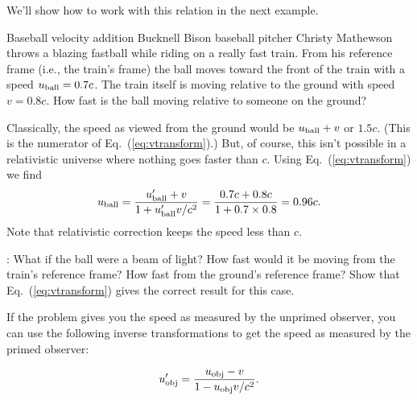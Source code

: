 We'll show how to work with this relation in the next example.

\begin{example}{Baseball velocity addition}
  Bucknell Bison baseball pitcher Christy Mathewson throws a blazing 
  fastball while riding on a really fast train.
  From his reference frame (i.e., the train's frame) the ball moves
  toward the front of the train with a speed $u_{\rm ball} = 0.7c$.
  The train itself is moving relative to the ground with speed $v =
  0.8c$.  How fast is the ball moving relative to someone on the
  ground?  

\solution Classically, the speed as viewed from the ground
  would be $u_{\rm ball} + v$ or $1.5c$.  (This is the numerator of
  Eq.~(\ref{eq:vtransform}).)  But, of course, this isn't possible in
  a relativistic universe where nothing goes faster than $c$.  Using
  Eq.~(\ref{eq:vtransform}) we find
\begin{equation}
  u_{\rm ball} = \frac{u_{\rm ball}^\prime + v}{1+ u_{\rm ball}^\prime v/c^2}
  = \frac{0.7c + 0.8c}{1+0.7\times 0.8} = 0.96c.
\end{equation}
Note that relativistic correction keeps the speed less than $c$.

: What if the ball were a beam of light?  How
fast would it be moving from the train's reference frame?  How fast
from the ground's reference frame?  Show that
Eq.~(\ref{eq:vtransform}) gives the correct result for this case.
\end{example}

If the problem gives you the speed as measured by the unprimed observer, 
you can use the following inverse transformations to get the speed as
measured by the primed observer:

\begin{boxiteq}
{
\begin{equation}
u_{\rm obj}^\prime = \frac{u_{\rm obj}- v}{1 - u_{\rm obj} v/c^2}.
\label{eq:vtransform-inverse}
\end{equation}
}
\end{boxiteq} 

